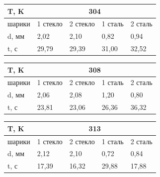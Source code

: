 \documentclass[a4paper,12pt]{article} %
\begin{document}
\begin{table}[h!]
\begin{tabular}{|l|llll|}
\hline
T,  K  & \multicolumn{4}{c|}{304}                                                                               \\ \hline
шарики & \multicolumn{1}{l|}{1 стекло} & \multicolumn{1}{l|}{2 стекло} & \multicolumn{1}{l|}{1 сталь} & 2 сталь \\ \hline
d, мм  & \multicolumn{1}{l|}{2,02}     & \multicolumn{1}{l|}{2,10}     & \multicolumn{1}{l|}{0,82}    & 0,94    \\ \hline
t, с   & \multicolumn{1}{l|}{29,79}    & \multicolumn{1}{l|}{29,39}    & \multicolumn{1}{l|}{31,00}   & 32,52   \\ \hline
\end{tabular}
\end{table}



\begin{table}[h!]
\begin{tabular}{|l|llll|}
\hline
T,  K  & \multicolumn{4}{c|}{308}                                                                               \\ \hline
шарики & \multicolumn{1}{l|}{1 стекло} & \multicolumn{1}{l|}{2 стекло} & \multicolumn{1}{l|}{1 сталь} & 2 сталь \\ \hline
d, мм  & \multicolumn{1}{l|}{2,06}     & \multicolumn{1}{l|}{2,08}     & \multicolumn{1}{l|}{1,20}    & 0,80    \\ \hline
t, с   & \multicolumn{1}{l|}{23,81}    & \multicolumn{1}{l|}{23,06}    & \multicolumn{1}{l|}{26,36}   & 36,32   \\ \hline
\end{tabular}
\end{table}



\begin{table}[h!]
\begin{tabular}{|l|llll|}
\hline
T,  K  & \multicolumn{4}{c|}{313}                                                                               \\ \hline
шарики & \multicolumn{1}{l|}{1 стекло} & \multicolumn{1}{l|}{2 стекло} & \multicolumn{1}{l|}{1 сталь} & 2 сталь \\ \hline
d, мм  & \multicolumn{1}{l|}{2,12}     & \multicolumn{1}{l|}{2,10}     & \multicolumn{1}{l|}{0,72}    & 0,84    \\ \hline
t, с   & \multicolumn{1}{l|}{17,39}    & \multicolumn{1}{l|}{16,32}    & \multicolumn{1}{l|}{29,88}   & 17,88   \\ \hline
\end{tabular}
\end{table}
\end{document}
